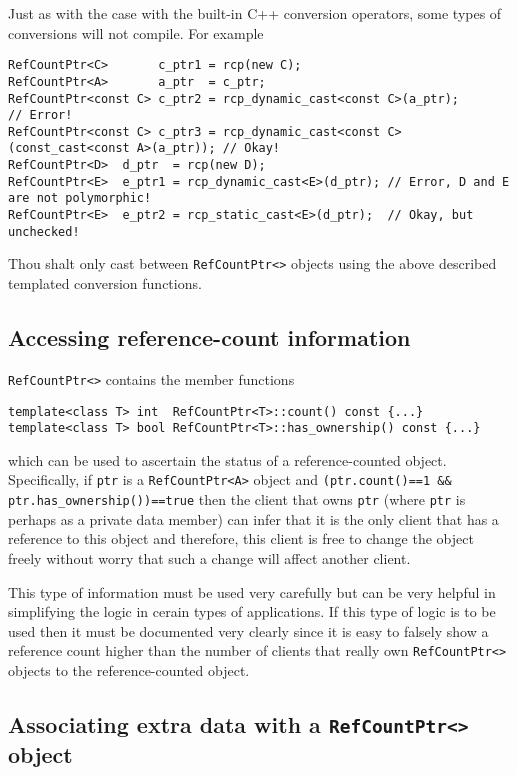 %
Just as with the case with the built-in C++ conversion operators, some
types of conversions will not compile.  For example
%
{\scriptsize\begin{verbatim}
RefCountPtr<C>       c_ptr1 = rcp(new C);
RefCountPtr<A>       a_ptr  = c_ptr;
RefCountPtr<const C> c_ptr2 = rcp_dynamic_cast<const C>(a_ptr);                      // Error!
RefCountPtr<const C> c_ptr3 = rcp_dynamic_cast<const C>(const_cast<const A>(a_ptr)); // Okay!
RefCountPtr<D>  d_ptr  = rcp(new D);
RefCountPtr<E>  e_ptr1 = rcp_dynamic_cast<E>(d_ptr); // Error, D and E are not polymorphic!
RefCountPtr<E>  e_ptr2 = rcp_static_cast<E>(d_ptr);  // Okay, but unchecked!
\end{verbatim}}

\begin{commandment}
Thou shalt only cast between \texttt{RefCountPtr<>} objects
using the above described templated conversion functions.
\end{commandment}

%
\subsection{Accessing reference-count information}
%

\texttt{RefCountPtr<>} contains the member functions
%
{\scriptsize\begin{verbatim}
template<class T> int  RefCountPtr<T>::count() const {...}
template<class T> bool RefCountPtr<T>::has_ownership() const {...}
\end{verbatim}}
%
\noindent{}which can be used to ascertain the status of a reference-counted
object.  Specifically, if \texttt{ptr} is a \texttt{RefCountPtr<A>}
object and \texttt{(ptr.count()==1 \&\& ptr.has\_ownership())==true}
then the client that owns \texttt{ptr} (where \texttt{ptr} is perhaps
as a private data member) can infer that it is the only client that
has a reference to this object and therefore, this client is free to
change the object freely without worry that such a change will affect
another client.

This type of information must be used very carefully but can be very
helpful in simplifying the logic in cerain types of applications. If
this type of logic is to be used then it must be documented very
clearly since it is easy to falsely show a reference count higher than
the number of clients that really own \texttt{RefCountPtr<>} objects to
the reference-counted object.

%
\subsection{Associating extra data with a \texttt{RefCountPtr<>} object}
%

